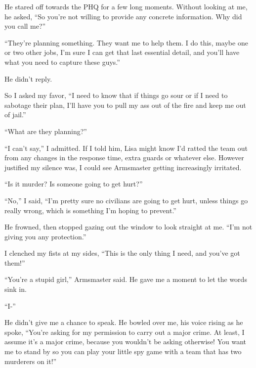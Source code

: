 He stared off towards the PHQ for a few long moments.  Without looking at me, he asked, ``So you're not willing to provide any concrete information.  Why did you call me?''



``They're planning something.  They want me to help them.  I do this, maybe one or two other jobs, I'm sure I can get that last essential detail, and you'll have what you need to capture these guys.''



He didn't reply.



So I asked my favor, ``I need to know that if things go sour or if I need to sabotage their plan, I'll have you to pull my ass out of the fire and keep me out of jail.''



``What are they planning?''



``I can't say,'' I admitted.  If I told him, Lisa might know I'd ratted the team out from any changes in the response time, extra guards or whatever else.  However justified my silence was, I could see Armsmaster getting increasingly irritated.



``Is it murder?  Is someone going to get hurt?''



``No,'' I said, ``I'm pretty sure no civilians are going to get hurt, unless things go really wrong, which is something I'm hoping to prevent.''



He frowned, then stopped gazing out the window to look straight at me. ``I'm not giving you any protection.''



I clenched my fists at my sides, ``This is the only thing I need, and you've got them!''



``You're a stupid girl,'' Armsmaster said.  He gave me a moment to let the words sink in.



``I-''



He didn't give me a chance to speak.  He bowled over me, his voice rising as he spoke, ``You're asking for my permission to carry out a major crime.  At least, I assume it's a major crime, because you wouldn't be asking otherwise!  You want me to stand by so you can play your little spy game with a team that has two murderers on it!''



